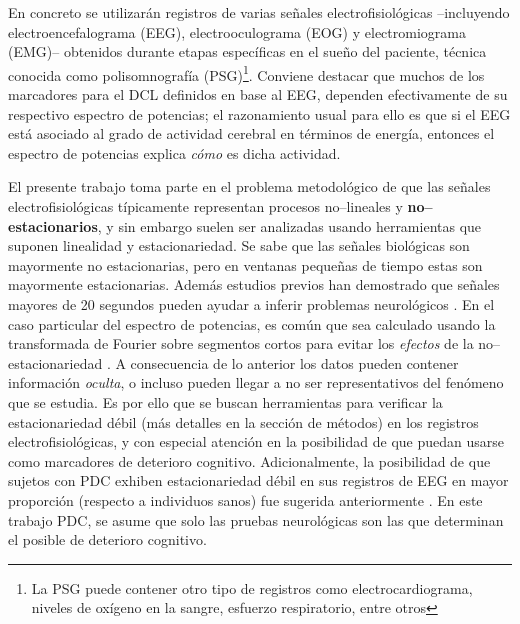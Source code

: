En concreto se utilizarán registros de varias señales electrofisiológicas --incluyendo 
electroencefalograma (EEG), electrooculograma (EOG) y electromiograma (EMG)-- obtenidos durante 
etapas específicas en el sueño del paciente, técnica conocida como polisomnografía (PSG)\footnote{La 
PSG puede contener otro tipo de registros como electrocardiograma, niveles de oxígeno en la sangre, 
esfuerzo respiratorio, entre otros}.
%
Conviene destacar que muchos de los marcadores para el DCL definidos en base al EEG, dependen
efectivamente de su respectivo espectro de potencias; el razonamiento usual para ello es que si el 
EEG está asociado al grado de actividad cerebral en términos de energía, entonces el espectro de 
potencias explica \textit{cómo} es dicha actividad.

El presente trabajo toma parte en el problema metodológico de que las señales 
electrofisiológicas típicamente representan procesos no--lineales y \textbf{no--estacionarios}, y sin 
embargo suelen ser analizadas usando herramientas que suponen linealidad y estacionariedad. Se sabe que
las señales biológicas son mayormente no estacionarias, pero en ventanas pequeñas de tiempo estas son
mayormente estacionarias. Además estudios previos han demostrado que señales mayores de 20 segundos pueden ayudar 
a inferir problemas neurológicos \cite{Cohen77}.
%
En el caso particular del espectro de potencias, es común que sea calculado usando la 
transformada de Fourier sobre segmentos cortos para evitar los \textit{efectos} de la 
no--estacionariedad \cite{Kaiser00}.
%
A consecuencia de lo anterior los datos pueden contener información \textit{oculta}, o incluso 
pueden llegar a no ser representativos del fenómeno que se estudia. 
%
Es por ello que se buscan herramientas para verificar la estacionariedad débil (más detalles en 
la sección de métodos)  en los registros electrofisiológicas, y con especial atención en la 
posibilidad de que puedan usarse como marcadores de deterioro cognitivo.
%
Adicionalmente, la posibilidad de que sujetos con PDC exhiben estacionariedad débil en sus 
registros de EEG en mayor proporción (respecto a individuos sanos) fue sugerida anteriormente
\cite{Cohen77}. En este trabajo PDC, se asume que solo las pruebas neurológicas son las que determinan
el posible de deterioro cognitivo.


